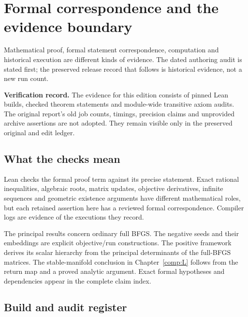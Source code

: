 \chapter{Formal correspondence and the evidence boundary}\label{comp:E}\label{E:chapter}
\renewcommand{\ModuleTag}{14}
Mathematical proof, formal statement correspondence, computation and historical execution are different kinds of evidence. The dated authoring audit is stated first; the preserved release record that follows is historical evidence, not a new run count.



\textbf{Verification record.} The evidence for this edition consists of pinned Lean builds, checked theorem statements and module-wide transitive axiom audits. The original report's old job counts, timings, precision claims and unprovided archive assertions are not adopted. They remain visible only in the preserved original and edit ledger.



\section{What the checks mean}\label{what-the-checks-mean}

Lean checks the formal proof term against its precise statement. Exact rational inequalities, algebraic roots, matrix updates, objective derivatives, infinite sequences and geometric existence arguments have different mathematical roles, but each retained assertion here has a reviewed formal correspondence. Compiler logs are evidence of the executions they record.

The principal results concern ordinary full BFGS. The negative seeds and their embeddings are explicit objective/run constructions. The positive framework derives its scalar hierarchy from the principal determinants of the full-BFGS matrices. The stable-manifold conclusion in Chapter~\ref{comp:L} follows from the return map and a proved analytic argument. Exact formal hypotheses and dependencies appear in the complete claim index.



\section{Build and audit register}\label{fresh-execution-register}

